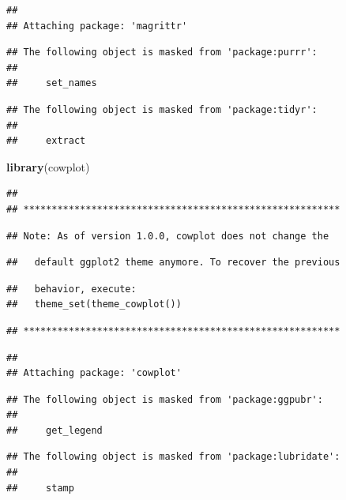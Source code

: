 \documentclass[]{article}
\newenvironment{Shaded}{\begin{snugshade}}{\end{snugshade}}
\newcommand{\KeywordTok}[1]{\textcolor[rgb]{0.13,0.29,0.53}{\textbf{#1}}}
\newcommand{\NormalTok}[1]{#1}
\begin{document}
\begin{verbatim}
## 
## Attaching package: 'magrittr'
\end{verbatim}

\begin{verbatim}
## The following object is masked from 'package:purrr':
## 
##     set_names
\end{verbatim}

\begin{verbatim}
## The following object is masked from 'package:tidyr':
## 
##     extract
\end{verbatim}

\begin{Shaded}
\begin{Highlighting}[]
\KeywordTok{library}\NormalTok{(cowplot)}
\end{Highlighting}
\end{Shaded}

\begin{verbatim}
## 
## ********************************************************
\end{verbatim}

\begin{verbatim}
## Note: As of version 1.0.0, cowplot does not change the
\end{verbatim}

\begin{verbatim}
##   default ggplot2 theme anymore. To recover the previous
\end{verbatim}

\begin{verbatim}
##   behavior, execute:
##   theme_set(theme_cowplot())
\end{verbatim}

\begin{verbatim}
## ********************************************************
\end{verbatim}

\begin{verbatim}
## 
## Attaching package: 'cowplot'
\end{verbatim}

\begin{verbatim}
## The following object is masked from 'package:ggpubr':
## 
##     get_legend
\end{verbatim}

\begin{verbatim}
## The following object is masked from 'package:lubridate':
## 
##     stamp
\end{verbatim}
\end{document}
